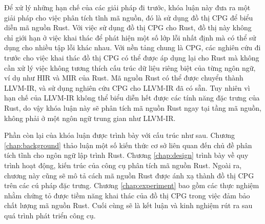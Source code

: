 
Để xử lý những hạn chế của các giải pháp đi trước, khóa luận này đưa ra một giải pháp cho việc phân tích tĩnh mã nguồn, đó là sử dụng đồ thị CPG để biểu diễn mã nguồn Rust.
Với việc sử dụng đồ thị CPG cho Rust, đồ thị này không chỉ giới hạn ở việc khai thác để phát hiện một số lớp lỗi nhất định mà có thể sử dụng cho nhiều tập lỗi khác nhau.
Với nền tảng chung là CPG, các nghiên cứu đi trước cho việc khai thác đồ thị CPG có thể được áp dụng lại cho Rust mà không cần xử lý việc không tương thích cấu trúc dữ liệu riêng biệt của từng ngôn ngữ, ví dụ như HIR và MIR của Rust.
Mã nguồn Rust có thể được chuyển thành LLVM-IR, và sử dụng nghiên cứu CPG cho LLVM-IR đã có sẵn.
Tuy nhiên vì hạn chế của LLVM-IR không thể biểu diễn hết được các tính năng đặc trưng của Rust, do vậy khóa luận này sẽ phân tích mã nguồn Rust ngay tại tầng mã nguồn, không phải ở một ngôn ngữ trung gian như LLVM-IR.

Phần còn lại của khóa luận được trình bày với cấu trúc như sau.
Chương \ref{chap:background} thảo luận một số kiến thức cơ sở liên quan đến chủ đề phân tích tĩnh cho ngôn ngữ lập trình Rust.
Chương \ref{chap:design} trình bày về quy trình hoạt động, kiến trúc của công cụ phân tích mã nguồn Rust.
Ngoài ra, chương này cũng sẽ mô tả cách mã nguồn Rust được ánh xạ thành đồ thị CPG trên các cú pháp đặc trưng.
Chương \ref{chap:experiment} bao gồm các thực nghiệm nhằm chứng tỏ được tiềm năng khai thác của đồ thị CPG trong việc đảm bảo chất lượng mã nguồn Rust.
Cuối cùng sẽ là kết luận và kinh nghiệm rút ra sau quá trình phát triển công cụ.
